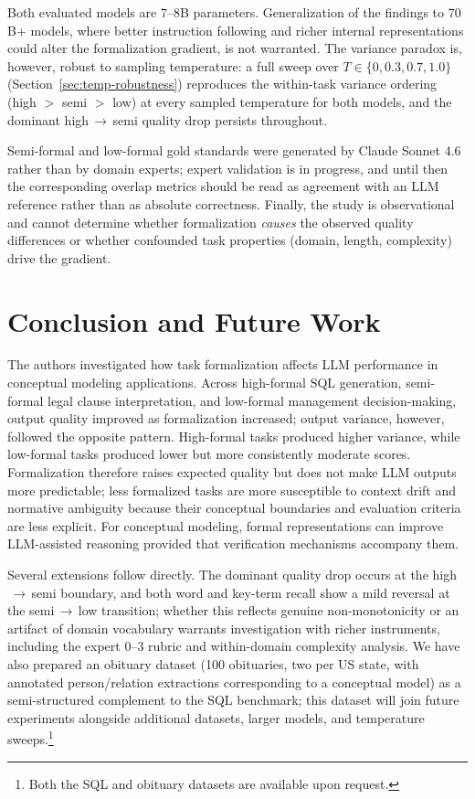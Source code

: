 \documentclass[runningheads]{llncs}
\begin{document}
Both evaluated models are $7$--$8$B parameters. Generalization of the findings to $70$B+ models, where better instruction following and richer internal representations could alter the formalization gradient, is not warranted. The variance paradox is, however, robust to sampling temperature: a full sweep over $T \in \{0, 0.3, 0.7, 1.0\}$ (Section~\ref{sec:temp-robustness}) reproduces the within-task variance ordering (high $>$ semi $>$ low) at every sampled temperature for both models, and the dominant high$\,\to\,$semi quality drop persists throughout.

Semi-formal and low-formal gold standards were generated by Claude Sonnet 4.6 rather than by domain experts; expert validation is in progress, and until then the corresponding overlap metrics should be read as agreement with an LLM reference rather than as absolute correctness. Finally, the study is observational and cannot determine whether formalization \emph{causes} the observed quality differences or whether confounded task properties (domain, length, complexity) drive the gradient.

\section{Conclusion and Future Work}
\label{sec:conclusion}

The authors investigated how task formalization affects LLM performance in conceptual modeling applications. Across high-formal SQL generation, semi-formal legal clause interpretation, and low-formal management decision-making, output quality improved as formalization increased; output variance, however, followed the opposite pattern. High-formal tasks produced higher variance, while low-formal tasks produced lower but more consistently moderate scores. Formalization therefore raises expected quality but does not make LLM outputs more predictable; less formalized tasks are more susceptible to context drift and normative ambiguity because their conceptual boundaries and evaluation criteria are less explicit. For conceptual modeling, formal representations can improve LLM-assisted reasoning provided that verification mechanisms accompany them.

Several extensions follow directly. The dominant quality drop occurs at the high$\,\to\,$semi boundary, and both word and key-term recall show a mild reversal at the semi$\,\to\,$low transition; whether this reflects genuine non-monotonicity
or an artifact of domain vocabulary warrants investigation with richer instruments, including the expert $0$--$3$ rubric and within-domain complexity analysis. We have also prepared an obituary dataset (100 obituaries, two per US state, with annotated person/relation extractions corresponding to a conceptual model) as a semi-structured complement to the SQL benchmark; this dataset will join future experiments alongside additional datasets, larger models, and temperature sweeps.\footnote{Both the SQL and obituary datasets are available upon request.}




\end{document}
